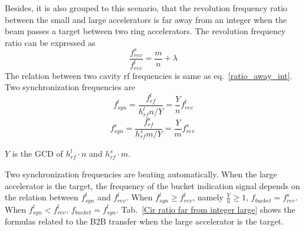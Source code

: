 %
%




Besides, it is also grouped to this scenario, that the revolution frequency ratio between the small and large accelerators is far away from an integer when the beam passes a target between two ring accelerators. The revolution frequency ratio can be expressed as
\begin{equation} 
\frac{f_{\mathit{rev}}^{s}}{f_{\mathit{rev}}^{l}}=\frac{m}{n}+ \lambda\label{close_to_interger2}
\end{equation}
The relation between two cavity rf frequencies is same as eq.~\ref{ratio_away_int}. Two synchronization frequencies are
\begin{equation}
f_{\mathit{syn}}^{l}=\frac{f_{\mathit{rf}}^{l}}{h^l_\mathit{rf}n/Y}=\frac{Y}{n}f_{\mathit{rev}}^{l} \label{synch_freq111_r}
\end{equation}
\begin{equation}
f_{\mathit{syn}}^{s}=\frac{f_{\mathit{rf}}^{s}}{h^s_\mathit{rf}m/Y}=\frac{Y}{m}f_{\mathit{rev}}^{s} \ \label{synch_freq222_r}
\end{equation}

$Y$ is the GCD of $h^l_\mathit{rf}\cdot n$ and $h^s_\mathit{rf} \cdot m$.

Two synchronization frequencies are beating automatically. When the large accelerator is the target, the frequency of the bucket indication signal depends on the relation between $f_{\mathit{syn}}^{l}$ and $f_{\mathit{rev}}^{l}$. When $f_{\mathit{syn}}^{l}\ge f_{\mathit{rev}}^{l}$, namely $\frac{Y}{n}\ge1$, $f_\mathit{bucket}=f_{\mathit{rev}}^{s}$. When $f_{\mathit{syn}}^{l}< f_{\mathit{rev}}^{l}$, $f_\mathit{bucket}=f_{\mathit{syn}}^{l}$. Tab.~\ref{Cir ratio far from integer large} shows the formulas related to the B2B transfer when the large accelerator is the target.

